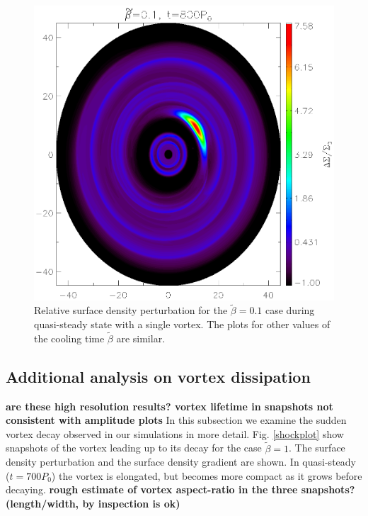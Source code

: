 \begin{figure}
  \includegraphics[width=\linewidth,height=\linewidth]{figures/vortex2D}
  \caption{Relative surface density perturbation for the
    $\tilde\beta=0.1$ case during quasi-steady state with a single
    vortex. The plots for other values of the cooling time
    $\tilde{\beta}$ are similar.
    \label{Vortex2D}} 
\end{figure}

\subsection{Additional analysis on vortex dissipation}
{\bf are these high resolution results? vortex lifetime in snapshots
  not consistent with amplitude plots}
In this subsection we examine the sudden vortex decay observed in our
simulations in more detail. Fig. \ref{shockplot} show snapshots
of the vortex leading up to its decay for the case $\tilde{\beta}=1$. 
The surface density perturbation and the surface density gradient are
shown. In quasi-steady ($t=700P_0$) the vortex is elongated, but becomes
more compact as it grows before decaying. {\bf rough estimate of
  vortex aspect-ratio in the three snapshots? 
  (length/width, by inspection is ok)}  

